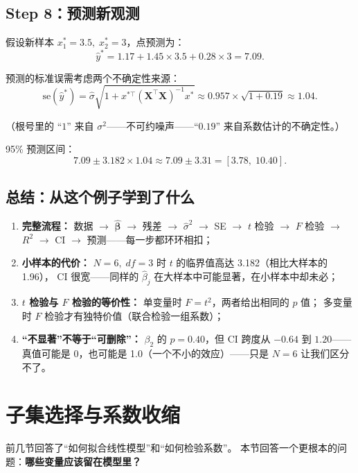 \subsection{Step 8：预测新观测}

假设新样本 $x_1^* = 3.5,\; x_2^* = 3$，点预测为：
\[
    \hat{y}^* = 1.17 + 1.45 \times 3.5 + 0.28 \times 3 = 7.09.
\]

预测的标准误需考虑两个不确定性来源：
\[
    \mathrm{se}(\hat{y}^*) = \hat{\sigma} \sqrt{1 + x^{*\top} (\mathbf{X}^\top \mathbf{X})^{-1} x^*}
    \approx 0.957 \times \sqrt{1 + 0.19} \approx 1.04.
\]

（根号里的 ``$1$'' 来自 $\sigma^2$——不可约噪声——``$0.19$'' 来自系数估计的不确定性。）

95\% 预测区间：
\[
    7.09 \pm 3.182 \times 1.04 \approx 7.09 \pm 3.31 = [3.78,\; 10.40].
\]

\subsection{总结：从这个例子学到了什么}

\begin{enumerate}[label=(\arabic*)]
    \item \textbf{完整流程：} 数据 $\to$ $\hat{\bm{\beta}}$ $\to$ 残差 $\to$ $\hat{\sigma}^2$ $\to$ SE $\to$ $t$ 检验 $\to$ $F$ 检验 $\to$ $R^2$ $\to$ CI $\to$ 预测——每一步都环环相扣；
    \item \textbf{小样本的代价：} $N=6,\; df=3$ 时 $t$ 的临界值高达 3.182（相比大样本的 1.96），
    CI 很宽——同样的 $\hat{\beta}_j$ 在大样本中可能显著，在小样本中却未必；
    \item \textbf{$t$ 检验与 $F$ 检验的等价性：} 单变量时 $F = t^2$，两者给出相同的 $p$ 值；
    多变量时 $F$ 检验才有独特价值（联合检验一组系数）；
    \item \textbf{``不显著''不等于``可删除''：} $\beta_2$ 的 $p = 0.40$，但 CI 跨度从 $-0.64$ 到 $1.20$——
    真值可能是 0，也可能是 1.0（一个不小的效应）——只是 $N=6$ 让我们区分不了。
\end{enumerate}

\section{子集选择与系数收缩}

前几节回答了``如何拟合线性模型''和``如何检验系数''。
本节回答一个更根本的问题：\textbf{哪些变量应该留在模型里？}

